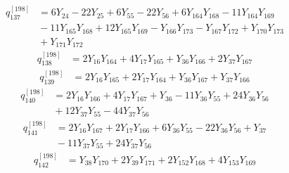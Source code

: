 \begin{equation}\label{q198:row:137}
\begin{aligned}
q_{137}^{[198]} &={} 6Y_{24} - 22Y_{25} + 6Y_{55} - 22Y_{56} + 6Y_{164}Y_{168} - 11Y_{164}Y_{169}\\
&{} - 11Y_{165}Y_{168} + 12Y_{165}Y_{169} - Y_{166}Y_{173} - Y_{167}Y_{172} + Y_{170}Y_{173}\\
&{} + Y_{171}Y_{172}
\end{aligned}
\end{equation}
\begin{equation}\label{q198:row:138}
\begin{aligned}
q_{138}^{[198]} &={} 2Y_{16}Y_{164} + 4Y_{17}Y_{165} + Y_{36}Y_{166} + 2Y_{37}Y_{167}
\end{aligned}
\end{equation}
\begin{equation}\label{q198:row:139}
\begin{aligned}
q_{139}^{[198]} &={} 2Y_{16}Y_{165} + 2Y_{17}Y_{164} + Y_{36}Y_{167} + Y_{37}Y_{166}
\end{aligned}
\end{equation}
\begin{equation}\label{q198:row:140}
\begin{aligned}
q_{140}^{[198]} &={} 2Y_{16}Y_{166} + 4Y_{17}Y_{167} + Y_{36} - 11Y_{36}Y_{55} + 24Y_{36}Y_{56}\\
&{} + 12Y_{37}Y_{55} - 44Y_{37}Y_{56}
\end{aligned}
\end{equation}
\begin{equation}\label{q198:row:141}
\begin{aligned}
q_{141}^{[198]} &={} 2Y_{16}Y_{167} + 2Y_{17}Y_{166} + 6Y_{36}Y_{55} - 22Y_{36}Y_{56} + Y_{37}\\
&{} - 11Y_{37}Y_{55} + 24Y_{37}Y_{56}
\end{aligned}
\end{equation}
\begin{equation}\label{q198:row:142}
\begin{aligned}
q_{142}^{[198]} &={} Y_{38}Y_{170} + 2Y_{39}Y_{171} + 2Y_{152}Y_{168} + 4Y_{153}Y_{169}
\end{aligned}
\end{equation}
